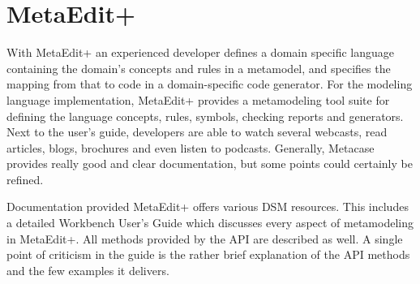 \section{MetaEdit+}
With MetaEdit+ an experienced developer defines a domain specific language containing the domain’s concepts and rules in a metamodel, and specifies the mapping from that to code in a domain-specific code generator. For the modeling language implementation, MetaEdit+ provides a metamodeling tool suite for defining the language concepts, rules, symbols, checking reports and generators. Next to the user’s guide, developers are able to watch several webcasts, read articles, blogs, brochures and even listen to podcasts. Generally, Metacase provides really good and clear documentation, but some points could certainly be refined.

Documentation provided
MetaEdit+ offers various DSM resources. This includes a detailed Workbench User’s Guide which discusses every aspect of metamodeling in MetaEdit+. All methods provided by the API are described as well. A single point of criticism in the guide is the rather brief explanation of the API methods and the few examples it delivers.